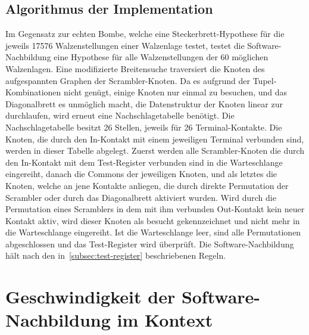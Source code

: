 \section{Algorithmus der Implementation}\label{sec:algorithm_bombe}
Im Gegensatz zur \glqq echten\grqq{} Bombe, welche eine Steckerbrett-Hypothese für die jeweils 17576 Walzenstellungen einer Walzenlage testet, testet die Software-Nachbildung eine Hypothese für alle Walzenstellungen der 60 möglichen Walzenlagen.
Eine modifizierte Breitensuche traversiert die Knoten des aufgespannten Graphen der \glqq Scrambler-Knoten\grqq.
Da es aufgrund der Tupel-Kombinationen nicht genügt, einige Knoten nur einmal zu besuchen, und das Diagonalbrett es unmöglich macht, die Datenstruktur der Knoten linear zur durchlaufen, wird erneut eine \glqq Nachschlagetabelle\grqq{} benötigt.
Die Nachschlagetabelle besitzt 26 Stellen, jeweils für 26 Terminal-Kontakte.
Die Knoten, die durch den In-Kontakt mit einem jeweiligen Terminal verbunden sind, werden in dieser Tabelle abgelegt.
Zuerst werden alle Scrambler-Knoten die durch den In-Kontakt mit dem Test-Register verbunden sind in die Warteschlange eingereiht, danach die Commons der jeweiligen Knoten, und als letztes die Knoten, welche an jene Kontakte anliegen, die durch direkte Permutation der Scrambler oder durch das Diagonalbrett aktiviert wurden.
Wird durch die Permutation eines Scramblers in dem mit ihm verbunden Out-Kontakt kein neuer Kontakt aktiv, wird dieser Knoten als \glqq besucht\grqq{} gekennzeichnet und nicht mehr in die Warteschlange eingereiht.
Ist die Warteschlange leer, sind alle Permutationen abgeschlossen und das Test-Register wird überprüft.
Die Software-Nachbildung hält nach den in~\cref{subsec:test-register} beschriebenen Regeln.




\chapter{Geschwindigkeit der Software-Nachbildung im Kontext}\label{ch:speed}